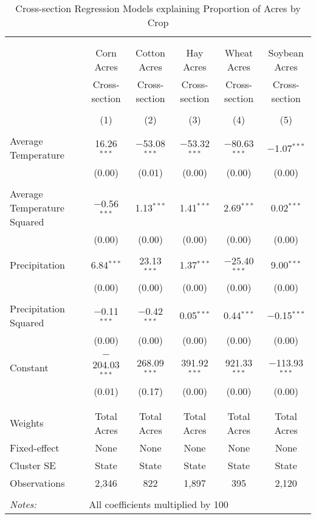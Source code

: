 \documentclass[10pt]{article}
\begin{document}
\newpage
\begin{table}[!htbp] \centering 
  \caption{Cross-section Regression Models explaining Proportion of Acres by Crop} 
  \label{} 
\footnotesize 
\begin{tabular}{@{\extracolsep{5pt}}lccccc} 
\\[-1.8ex]\hline 
\hline \\[-1.8ex] 
\\[-1.8ex] & Corn Acres & Cotton Acres & Hay Acres & Wheat Acres & Soybean Acres \\ 
 & Cross-section & Cross-section & Cross-section & Cross-section & Cross-section \\ 
\\[-1.8ex] & (1) & (2) & (3) & (4) & (5)\\ 
\hline \\[-1.8ex] 
 Average Temperature & 16.26$^{***}$ & $-$53.08$^{***}$ & $-$53.32$^{***}$ & $-$80.63$^{***}$ & $-$1.07$^{***}$ \\ 
  & (0.00) & (0.01) & (0.00) & (0.00) & (0.00) \\ 
  & & & & & \\ 
 Average Temperature Squared & $-$0.56$^{***}$ & 1.13$^{***}$ & 1.41$^{***}$ & 2.69$^{***}$ & 0.02$^{***}$ \\ 
  & (0.00) & (0.00) & (0.00) & (0.00) & (0.00) \\ 
  & & & & & \\ 
 Precipitation & 6.84$^{***}$ & 23.13$^{***}$ & 1.37$^{***}$ & $-$25.40$^{***}$ & 9.00$^{***}$ \\ 
  & (0.00) & (0.00) & (0.00) & (0.00) & (0.00) \\ 
  & & & & & \\ 
 Precipitation Squared & $-$0.11$^{***}$ & $-$0.42$^{***}$ & 0.05$^{***}$ & 0.44$^{***}$ & $-$0.15$^{***}$ \\ 
  & (0.00) & (0.00) & (0.00) & (0.00) & (0.00) \\ 
  & & & & & \\ 
 Constant & $-$204.03$^{***}$ & 268.09$^{***}$ & 391.92$^{***}$ & 921.33$^{***}$ & $-$113.93$^{***}$ \\ 
  & (0.01) & (0.17) & (0.00) & (0.00) & (0.00) \\ 
  & & & & & \\ 
\hline \\[-1.8ex] 
Weights & Total Acres & Total Acres & Total Acres & Total Acres & Total Acres \\ 
Fixed-effect & None & None & None & None & None \\ 
Cluster SE & State & State & State & State & State \\ 
Observations & 2,346 & 822 & 1,897 & 395 & 2,120 \\ 
\hline 
\hline \\[-1.8ex] 
\textit{Notes:} & \multicolumn{5}{l}{All coefficients multiplied by 100} \\ 
\end{tabular} 
\end{table} 
\end{document}
